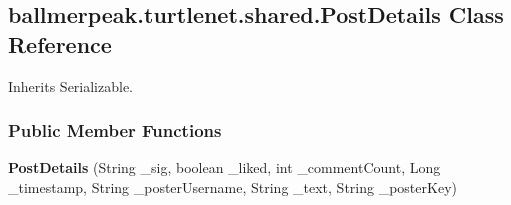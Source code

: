 \hypertarget{classballmerpeak_1_1turtlenet_1_1shared_1_1PostDetails}{\subsection{ballmerpeak.\-turtlenet.\-shared.\-Post\-Details Class Reference}
\label{classballmerpeak_1_1turtlenet_1_1shared_1_1PostDetails}
}


Inherits Serializable.

\subsubsection*{Public Member Functions}
\begin{DoxyCompactItemize}
\item 
\hypertarget{classballmerpeak_1_1turtlenet_1_1shared_1_1PostDetails_a1f3b272444d0abfc4e4fc374c2a0c833}{{\bfseries Post\-Details} (String \-\_\-sig, boolean \-\_\-liked, int \-\_\-comment\-Count, Long \-\_\-timestamp, String \-\_\-poster\-Username, String \-\_\-text, String \-\_\-poster\-Key)}\label{classballmerpeak_1_1turtlenet_1_1shared_1_1PostDetails_a1f3b272444d0abfc4e4fc374c2a0c833}

\end{DoxyCompactItemize}
